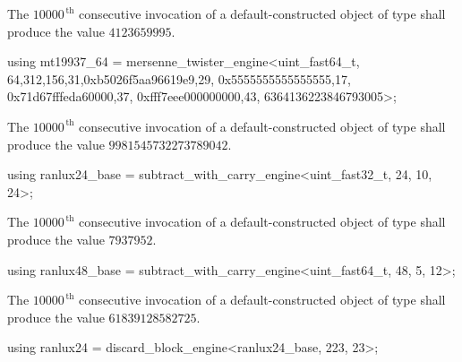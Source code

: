 \begin{itemdescr}
\pnum\required
 The $10000^{\,\mathrm{th}}$ consecutive invocation
 of a default-constructed object
 of type 
 shall produce the value $4123659995$.
\end{itemdescr}

%
%
\begin{itemdecl}
using mt19937_64 =
      mersenne_twister_engine<uint_fast64_t,
       64,312,156,31,0xb5026f5aa96619e9,29,
       0x5555555555555555,17,
       0x71d67fffeda60000,37,
       0xfff7eee000000000,43,
       6364136223846793005>;
\end{itemdecl}

\begin{itemdescr}
\pnum\required
 The $10000^{\,\mathrm{th}}$ consecutive invocation
 of a default-constructed object
 of type 
 shall produce the value $9981545732273789042$.
\end{itemdescr}

%
%
\begin{itemdecl}
using ranlux24_base =
      subtract_with_carry_engine<uint_fast32_t, 24, 10, 24>;
\end{itemdecl}

\begin{itemdescr}
\pnum\required
 The $10000^{\,\mathrm{th}}$ consecutive invocation
 of a default-constructed object
 of type 
 shall produce the value
 $ 7937952 $.
\end{itemdescr}

%
%
\begin{itemdecl}
using ranlux48_base =
      subtract_with_carry_engine<uint_fast64_t, 48, 5, 12>;
\end{itemdecl}

\begin{itemdescr}
\pnum\required
 The $10000^{\,\mathrm{th}}$ consecutive invocation
 of a default-constructed object
 of type 
 shall produce the value
 $ 61839128582725 $.
\end{itemdescr}

%
%
\begin{itemdecl}
using ranlux24 = discard_block_engine<ranlux24_base, 223, 23>;
\end{itemdecl}

